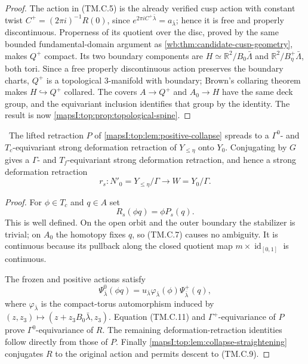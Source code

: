 \begin{proof}
The action in (TM.C.5) is the already verified cusp action with constant twist
$C^+=(2\pi i)^{-1}R(0)$, since
$e^{2\pi iC^+\bar\lambda}=a_{\bar\lambda}$; hence it is free and properly
discontinuous.  Properness of its quotient over
the disc, proved by the same bounded fundamental-domain argument as
\cref{wb:thm:candidate-cusp-geometry}, makes $Q^+$ compact.  Its two boundary
components are $H\simeq\mathbb R^2/B_0\bar\Lambda$ and
$\mathbb R^2/B_\eta^+\bar\Lambda$, both tori.  Since a free properly
discontinuous action preserves the boundary charts, $Q^+$ is a topological
$3$-manifold with boundary; Brown's collaring theorem makes
$H\hookrightarrow Q^+$ collared.  The covers $A\to Q^+$ and
$A_0\to H$ have the same deck group, and the equivariant inclusion identifies
that group by the identity.  The result is now
\cref{mapsI:top:prop:topological-spine}.
\end{proof}

\begin{lemma}
\label{mapsI:top:lem:phase-spread-collapse}
\ The lifted retraction $P$ of \cref{mapsI:top:lem:positive-collapse} spreads
to a $\Gamma^0$- and $T_c$-equivariant strong deformation retraction of
$Y_{\leq\eta}$ onto $Y_0$.  Conjugating by $G$ gives a $\Gamma$- and
$T_f$-equivariant strong deformation retraction, and hence a strong
deformation retraction
\[
 r_s:N'_0=Y_{\leq\eta}/\Gamma\longrightarrow W=Y_0/\Gamma.
\tag{TM.C.9}
\]
\end{lemma}

\begin{proof}
For $\phi\in T_c$ and $q\in A$ set
\[
 R_s(\phi q)=\phi P_s(q).
\tag{TM.C.10}
\]
This is well defined.  On the open orbit and the outer boundary the
stabilizer is trivial; on $A_0$ the homotopy fixes $q$, so (TM.C.7) causes no
ambiguity.  It is continuous because its pullback along the closed quotient
map $m\times\operatorname{id}_{[0,1]}$ is continuous.

The frozen and positive actions satisfy
\[
 \Psi^0_{\bar\lambda}(\phi q)=
 u_{\bar\lambda}\varphi_{\bar\lambda}(\phi)
 \Psi^+_{\bar\lambda}(q),
\tag{TM.C.11}
\]
where $\varphi_{\bar\lambda}$ is the compact-torus automorphism induced by
$(z,z_3)\mapsto(z+z_3B_0\bar\lambda,z_3)$.  Equation (TM.C.11) and
$\Gamma^+$-equivariance of $P$ prove $\Gamma^0$-equivariance of $R$.
The remaining deformation-retraction identities follow directly from those
of $P$.  Finally \cref{mapsI:top:lem:collapse-straightening} conjugates $R$ to the
original action and permits descent to (TM.C.9).
\end{proof}

